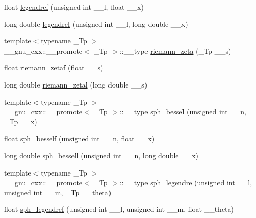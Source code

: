 \begin{DoxyCompactItemize}
\item 
float \hyperlink{group__tr29124__math__spec__func_gaed94e3c664c99f5204da75be75aeac21}{legendref} (unsigned int \+\_\+\+\_\+l, float \+\_\+\+\_\+x)
\item 
long double \hyperlink{group__tr29124__math__spec__func_ga1b39bc22e3cc4860d08eb54099460391}{legendrel} (unsigned int \+\_\+\+\_\+l, long double \+\_\+\+\_\+x)
\item 
{\footnotesize template$<$typename \+\_\+\+Tp $>$ }\\\+\_\+\+\_\+gnu\+\_\+cxx\+::\+\_\+\+\_\+promote$<$ \+\_\+\+Tp $>$\+::\+\_\+\+\_\+type \hyperlink{group__tr29124__math__spec__func_ga67a6bfed9b6ab692e8c798b674431424}{riemann\+\_\+zeta} (\+\_\+\+Tp \+\_\+\+\_\+s)
\item 
float \hyperlink{group__tr29124__math__spec__func_gaf92063315061a56d3e2c4053156d968e}{riemann\+\_\+zetaf} (float \+\_\+\+\_\+s)
\item 
long double \hyperlink{group__tr29124__math__spec__func_ga1e92da3b878d75270f38d3ec9b513086}{riemann\+\_\+zetal} (long double \+\_\+\+\_\+s)
\item 
{\footnotesize template$<$typename \+\_\+\+Tp $>$ }\\\+\_\+\+\_\+gnu\+\_\+cxx\+::\+\_\+\+\_\+promote$<$ \+\_\+\+Tp $>$\+::\+\_\+\+\_\+type \hyperlink{group__tr29124__math__spec__func_ga478e517ed975bcb256de230e64f0fda5}{sph\+\_\+bessel} (unsigned int \+\_\+\+\_\+n, \+\_\+\+Tp \+\_\+\+\_\+x)
\item 
float \hyperlink{group__tr29124__math__spec__func_ga534e36e1dcefad8daec98920db16eec4}{sph\+\_\+besself} (unsigned int \+\_\+\+\_\+n, float \+\_\+\+\_\+x)
\item 
long double \hyperlink{group__tr29124__math__spec__func_ga11d72b1af81ce9da3c878a25087ee927}{sph\+\_\+bessell} (unsigned int \+\_\+\+\_\+n, long double \+\_\+\+\_\+x)
\item 
{\footnotesize template$<$typename \+\_\+\+Tp $>$ }\\\+\_\+\+\_\+gnu\+\_\+cxx\+::\+\_\+\+\_\+promote$<$ \+\_\+\+Tp $>$\+::\+\_\+\+\_\+type \hyperlink{group__tr29124__math__spec__func_ga573842c12247b87746b548f1945755a8}{sph\+\_\+legendre} (unsigned int \+\_\+\+\_\+l, unsigned int \+\_\+\+\_\+m, \+\_\+\+Tp \+\_\+\+\_\+theta)
\item 
float \hyperlink{group__tr29124__math__spec__func_gaae635d28c06a3be2679901b382090852}{sph\+\_\+legendref} (unsigned int \+\_\+\+\_\+l, unsigned int \+\_\+\+\_\+m, float \+\_\+\+\_\+theta)
\item 

\end{DoxyCompactItemize}
